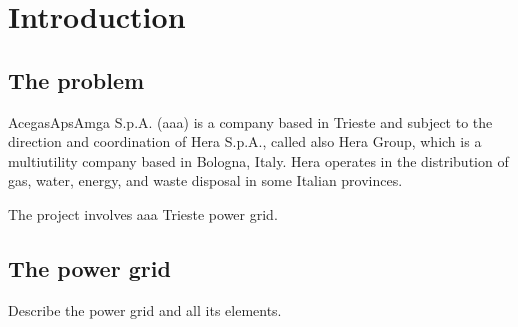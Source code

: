 \chapter{Introduction}



\section{The problem}

AcegasApsAmga S.p.A. (\acrshort{aaa}) is a company based in Trieste and subject to the direction and coordination of Hera S.p.A., called also Hera Group, which is a multiutility company based in Bologna, Italy. Hera operates in the distribution of gas, water, energy, and waste disposal in some Italian provinces.

The project involves \acrshort{aaa} Trieste power grid.



\section{The power grid}

Describe the power grid and all its elements.